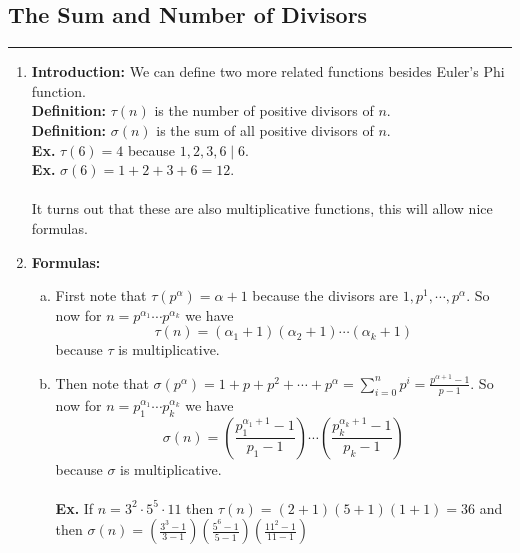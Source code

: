 \documentclass[class=article, crop=false]{standalone}
\begin{document}
\subsection{The Sum and Number of Divisors}
\rule{\textwidth}{1pt}
\begin{enumerate}[1.]
\item \textbf{Introduction:} We can define two more related functions besides Euler's Phi function. \\
\textbf{Definition:} $\tau (n)$ is the number of positive divisors of $n$. \\
\textbf{Definition:} $\sigma (n)$ is the sum of all positive divisors of $n$. \\
\textbf{Ex.} $\tau (6) = 4$ because $1,2,3,6\mid 6$. \\
\textbf{Ex.} $\sigma (6) = 1+2+3+6 = 12$. \\\\
It turns out that these are also multiplicative functions, this will allow nice formulas.

\item \textbf{Formulas:}
\begin{enumerate}[(a)]
	\item First note that $\tau (p^{\alpha}) = \alpha + 1$ because the divisors are 
	$1,p^1,\cdots, p^{\alpha}$. So now for $n = p^{\alpha_1}\cdots p^{\alpha_k}$ we have 
	$$\tau (n) = (\alpha_1 + 1)(\alpha_2 + 1)\cdots (\alpha_k + 1)$$ 
	because $\tau$ is multiplicative.

	\item Then note that $\sigma(p^{\alpha}) = 1+p+p^2+\cdots +p^{\alpha} = \sum_{i=0}^{n} p^{i} = \frac{p^{\alpha+1}-1}{p-1}$.
	So now for $n = p_1^{\alpha_1}\cdots p_k^{\alpha_k}$ we have
	$$\sigma (n) = \left(\frac{p_1^{\alpha_1 + 1}-1}{p_1 -1}\right)\cdots \left(\frac{p_k^{\alpha_k +1}-1}{p_k-1}\right)$$
	because $\sigma$ is multiplicative. \\\\
	\textbf{Ex.} If $n = 3^2\cdot 5^5\cdot 11$ then $\tau(n) = (2+1)(5+1)(1+1) = 36$ and then
	$\sigma(n) = \left(\frac{3^3 - 1}{3-1}\right)\left(\frac{5^6-1}{5-1}\right)\left(\frac{11^2-1}{11-1}\right)$
\end{enumerate}


\end{enumerate}
\end{document}
